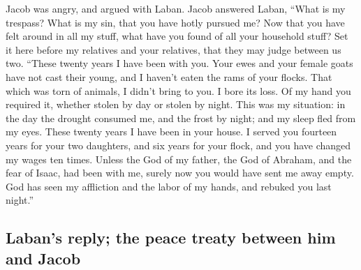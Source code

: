 \begin{paracol}{2}
\begin{otherlanguage}{english}
 Jacob was angry, and argued with Laban. Jacob answered
Laban, ``What is my trespass? What is my sin, that you have hotly
pursued me?  Now that you have felt around in all my
stuff, what have you found of all your household stuff? Set it here
before my relatives and your relatives, that they may judge between us
two.  ``These twenty years I have been with you. Your
ewes and your female goats have not cast their young, and I haven't
eaten the rams of your flocks.  That which was torn of
animals, I didn't bring to you. I bore its loss. Of my hand you required
it, whether stolen by day or stolen by night.  This was
my situation: in the day the drought consumed me, and the frost by
night; and my sleep fled from my eyes.  These twenty
years I have been in your house. I served you fourteen years for your
two daughters, and six years for your flock, and you have changed my
wages ten times.  Unless the God of my father, the God of
Abraham, and the fear of Isaac, had been with me, surely now you would
have sent me away empty. God has seen my affliction and the labor of my
hands, and rebuked you last night.''

\hypertarget{labans-reply-the-peace-treaty-between-him-and-jacob}{%
\subsection{Laban's reply; the peace treaty between him and
Jacob}\label{labans-reply-the-peace-treaty-between-him-and-jacob}}


\end{otherlanguage}
\end{paracol}
